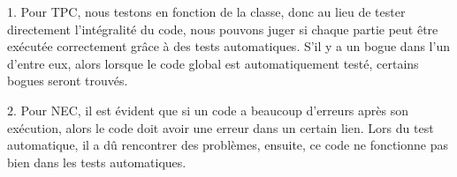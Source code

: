 \documentclass{article}
\begin{document}
1. Pour TPC, nous testons en fonction de la classe, donc au lieu de tester directement l'intégralité du code, nous pouvons juger si chaque partie peut être exécutée correctement grâce à des tests automatiques. S'il y a un bogue dans l'un d'entre eux, alors lorsque le code global est automatiquement testé, certains bogues seront trouvés.

2. Pour NEC, il est évident que si un code a beaucoup d'erreurs après son exécution, alors le code doit avoir une erreur dans un certain lien. Lors du test automatique, il a dû rencontrer des problèmes, ensuite, ce code ne fonctionne pas bien dans les tests automatiques.
\end{document}
